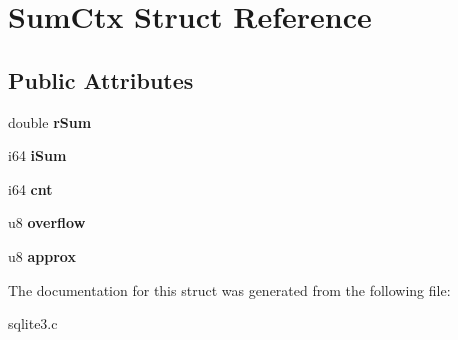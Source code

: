 \hypertarget{structSumCtx}{}\section{Sum\+Ctx Struct Reference}
\label{structSumCtx}
\subsection*{Public Attributes}
\begin{DoxyCompactItemize}
\item 
double {\bfseries r\+Sum}\hypertarget{structSumCtx_a1774080b9bcada2f4e867eaf40763f41}{}\label{structSumCtx_a1774080b9bcada2f4e867eaf40763f41}

\item 
i64 {\bfseries i\+Sum}\hypertarget{structSumCtx_ace6196fb30ebc0687997a723d55683db}{}\label{structSumCtx_ace6196fb30ebc0687997a723d55683db}

\item 
i64 {\bfseries cnt}\hypertarget{structSumCtx_ada00261fe604a7cc6719fdcd8bb5914c}{}\label{structSumCtx_ada00261fe604a7cc6719fdcd8bb5914c}

\item 
u8 {\bfseries overflow}\hypertarget{structSumCtx_a3b14a5da00584aff08314d5e9ddbe9ea}{}\label{structSumCtx_a3b14a5da00584aff08314d5e9ddbe9ea}

\item 
u8 {\bfseries approx}\hypertarget{structSumCtx_a035a2a22271fee066d9a92d12fe3b9a5}{}\label{structSumCtx_a035a2a22271fee066d9a92d12fe3b9a5}

\end{DoxyCompactItemize}


The documentation for this struct was generated from the following file\+:\begin{DoxyCompactItemize}
\item 
sqlite3.\+c\end{DoxyCompactItemize}
